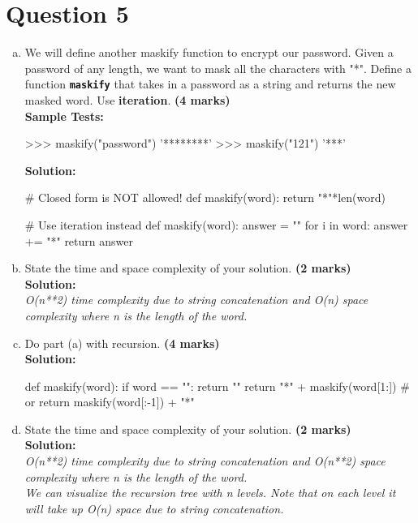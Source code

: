 \section{Question 5}
\begin{enumerate}[(a)]
\item We will define another maskify function to encrypt our password. Given a password
of any length, we want to mask all the characters with "*". Define a function \texttt{\bfseries maskify}
that takes in a password as a string and returns the new masked word. Use \textbf{iteration}. \textbf{(4 marks)} \\
\textbf{Sample Tests:}
\begin{python}
>>> maskify("password")
'********'
>>> maskify("121")
'***'
\end{python}
\textbf{Solution:}
\begin{python}
# Closed form is NOT allowed!
def maskify(word):
    return "*"*len(word)

# Use iteration instead
def maskify(word):
    answer = ""
    for i in word:
        answer += "*"
    return answer
\end{python}

\item State the time and space complexity of your solution. \textbf{(2 marks)} \\
\textbf{Solution:} \\
\textit{O(n**2) time complexity due to string concatenation and O(n) space complexity where n is the length of the word.}

\item Do part (a) with recursion. \textbf{(4 marks)} \\
\textbf{Solution:}
\begin{python}
def maskify(word):
    if word == "":
        return ""
    return "*" + maskify(word[1:])
    # or return maskify(word[:-1]) + "*"
\end{python}

\item State the time and space complexity of your solution. \textbf{(2 marks)} \\
\textbf{Solution:} \\
\textit{O(n**2) time complexity due to string concatenation and O(n**2) space complexity where n is the length of the word. \\
We can visualize the recursion tree with n levels. Note that on each level it will take up O(n) space due to string concatenation.}


\end{enumerate}
